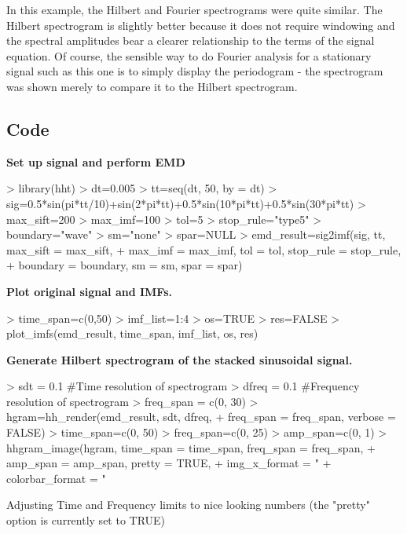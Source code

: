 \documentclass[12pt]{article}
\begin{document}
In this example, the Hilbert and Fourier spectrograms were quite similar. 
The Hilbert spectrogram is slightly better because it does not require windowing and the spectral amplitudes bear a clearer relationship to the terms of the signal equation.
Of course, the sensible way to do Fourier analysis for a stationary signal such as this one is to simply display the periodogram - the spectrogram was shown merely to compare it to the Hilbert spectrogram.

\subsection{Code}

\textbf{Set up signal and perform EMD}
\begin{Schunk}
\begin{Sinput}
> library(hht)
> dt=0.005
> tt=seq(dt, 50, by = dt)
> sig=0.5*sin(pi*tt/10)+sin(2*pi*tt)+0.5*sin(10*pi*tt)+0.5*sin(30*pi*tt)
> max_sift=200
> max_imf=100
> tol=5
> stop_rule="type5"
> boundary="wave"
> sm="none"
> spar=NULL
> emd_result=sig2imf(sig, tt, max_sift = max_sift,
+     max_imf = max_imf, tol = tol, stop_rule = stop_rule, 
+     boundary = boundary, sm = sm, spar = spar)
\end{Sinput}
\end{Schunk}

\textbf{Plot original signal and IMFs.}
\begin{Schunk}
\begin{Sinput}
> time_span=c(0,50)
> imf_list=1:4
> os=TRUE
> res=FALSE
> plot_imfs(emd_result, time_span, imf_list, os, res)
\end{Sinput}
\end{Schunk}

\textbf{Generate Hilbert spectrogram of the stacked sinusoidal signal.}

\begin{Schunk}
\begin{Sinput}
> sdt = 0.1 #Time resolution of spectrogram
> dfreq = 0.1 #Frequency resolution of spectrogram
> freq_span = c(0, 30)
> hgram=hh_render(emd_result, sdt, dfreq, 
+     freq_span = freq_span, verbose = FALSE)
> time_span=c(0, 50)
> freq_span=c(0, 25)
> amp_span=c(0, 1)
> hhgram_image(hgram, time_span = time_span, freq_span = freq_span, 
+     amp_span = amp_span, pretty = TRUE, 
+     img_x_format = "%
+     colorbar_format = "%
\end{Sinput}
\begin{Soutput}
Adjusting Time and Frequency limits to nice looking numbers (the "pretty" option is currently set to TRUE)
\end{Soutput}
\end{Schunk}
\end{document}
